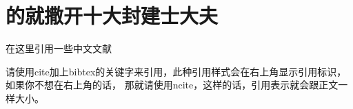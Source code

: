 \chapter{的就撒开十大封建士大夫}
在这里引用一些中文文献\cite{zhang1982,cai1999tracking,Dollar2012PAMI,zajdel2005keeping}

请使用cite加上bibtex的关键字来引用，此种引用样式会在右上角显示引用标识，如果你不想在右上角的话， 那就请使用ncite，这样的话，引用表示就会跟正文一样大小。